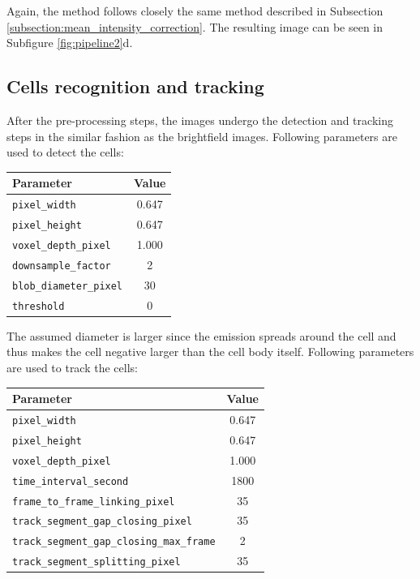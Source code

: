 \documentclass[pdftex,12pt,a4paper]{report}
\begin{document}
Again, the method follows closely the same method described in Subsection \ref{subsection:mean_intensity_correction}. The resulting image can be seen in Subfigure \ref{fig:pipeline2}d.

\subsection{Cells recognition and tracking}

After the pre-processing steps, the images undergo the detection and tracking steps in the similar fashion as the brightfield images. Following parameters are used to detect the cells:

\begin{table}[H]
\centering
\begin{tabular}[t]{ l | c }
Parameter & Value \\
\hline
\texttt{pixel\_width} & 0.647 \\
\texttt{pixel\_height} & 0.647 \\
\texttt{voxel\_depth\_pixel} & 1.000 \\
\texttt{downsample\_factor} & 2 \\
\texttt{blob\_diameter\_pixel} & 30 \\
\texttt{threshold} & 0 \\
\end{tabular}
\end{table}

The assumed diameter is larger since the emission spreads around the cell and thus makes the cell negative larger than the cell body itself. Following parameters are used to track the cells:

\begin{table}[H]
\centering
\begin{tabular}[t]{ l | c }
Parameter & Value \\
\hline
\texttt{pixel\_width} & 0.647 \\
\texttt{pixel\_height} & 0.647 \\
\texttt{voxel\_depth\_pixel} & 1.000 \\
\texttt{time\_interval\_second} & 1800\\
\texttt{frame\_to\_frame\_linking\_pixel} & 35 \\
\texttt{track\_segment\_gap\_closing\_pixel} & 35 \\
\texttt{track\_segment\_gap\_closing\_max\_frame} & 2 \\
\texttt{track\_segment\_splitting\_pixel} & 35 \\
\end{tabular}
\end{table}
\end{document}
